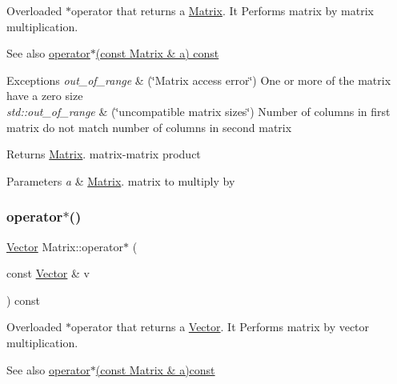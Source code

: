 Overloaded $\ast$operator that returns a \hyperlink{class_matrix}{Matrix}. It Performs matrix by matrix multiplication. \begin{DoxySeeAlso}{See also}
\hyperlink{class_matrix_aaa40c78e6b3bb5bbf572d35612dbf6a7}{operator$\ast$(const Matrix \& a) const} 
\end{DoxySeeAlso}

\begin{DoxyExceptions}{Exceptions}
{\em out\+\_\+of\+\_\+range} & (\char`\"{}\+Matrix access error\char`\"{}) One or more of the matrix have a zero size \\
\hline
{\em std\+::out\+\_\+of\+\_\+range} & (\char`\"{}uncompatible matrix sizes\char`\"{}) Number of columns in first matrix do not match number of columns in second matrix \\
\hline
\end{DoxyExceptions}
\begin{DoxyReturn}{Returns}
\hyperlink{class_matrix}{Matrix}. matrix-\/matrix product 
\end{DoxyReturn}

\begin{DoxyParams}{Parameters}
{\em a} & \hyperlink{class_matrix}{Matrix}. matrix to multiply by \\
\hline
\end{DoxyParams}
\mbox{\label{class_matrix_a843eebe2b6bd9d8091be600f685252cb}} 
\subsubsection{\texorpdfstring{operator$\ast$()}{operator*()}\hspace{0.1cm}{\footnotesize\ttfamily [2/2]}}
{\footnotesize\ttfamily \hyperlink{class_vector}{Vector} Matrix\+::operator$\ast$ (\begin{DoxyParamCaption}\item[{const \hyperlink{class_vector}{Vector} \&}]{v }\end{DoxyParamCaption}) const}

Overloaded $\ast$operator that returns a \hyperlink{class_vector}{Vector}. It Performs matrix by vector multiplication. \begin{DoxySeeAlso}{See also}
\hyperlink{class_matrix_aaa40c78e6b3bb5bbf572d35612dbf6a7}{operator$\ast$(const Matrix \& a)const} 
\end{DoxySeeAlso}


